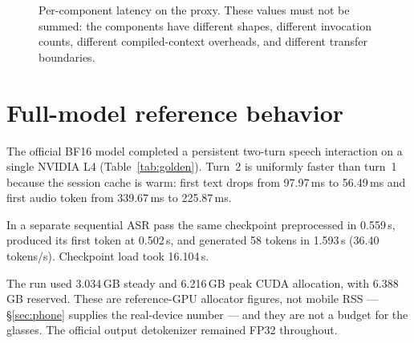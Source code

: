 \documentclass[10pt,twocolumn,letterpaper]{article}
\begin{document}
\begin{figure}[t]
\centering
{}
\caption{Per-component latency on the proxy. These values must not be summed:
the components have different shapes, different invocation counts,
different compiled-context overheads, and different transfer boundaries.}
\label{fig:latency}
\end{figure}

\section{Full-model reference behavior}
\label{sec:golden}

The official BF16 model completed a persistent two-turn speech interaction on
a single NVIDIA L4 (Table~\ref{tab:golden}). Turn~2 is uniformly faster than
turn~1 because the session cache is warm: first text drops from 97.97\,ms to
56.49\,ms and first audio token from 339.67\,ms to 225.87\,ms.

In a separate sequential ASR pass the same checkpoint preprocessed in
0.559\,s, produced its first token at 0.502\,s, and generated 58 tokens in
1.593\,s (36.40 tokens/s). Checkpoint load took 16.104\,s.

The run used 3.034\,GB steady and 6.216\,GB peak CUDA allocation, with
6.388\,GB reserved. These are reference-GPU allocator figures, not mobile RSS
--- \S\ref{sec:phone} supplies the real-device number --- and they are not a
budget for the glasses. The official output detokenizer remained FP32
throughout.
\end{document}
